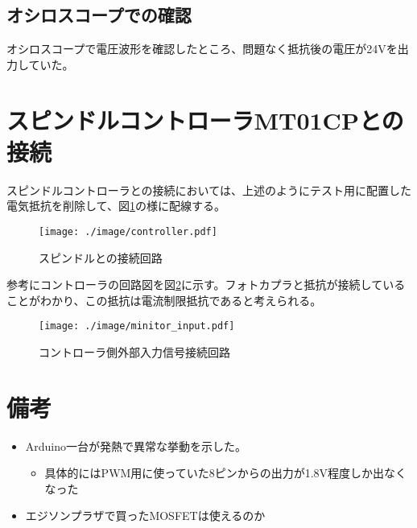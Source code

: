 \documentclass[]{jsarticle}
\begin{document}
\subsection{オシロスコープでの確認}
オシロスコープで電圧波形を確認したところ、問題なく抵抗後の電圧が24Vを出力していた。

\section{スピンドルコントローラMT01CPとの接続}
スピンドルコントローラとの接続においては、上述のようにテスト用に配置した電気抵抗を削除して、図\ref{controller}の様に配線する。
\begin{figure}[htbp]
\centering
\texttt{[image: ./image/controller.pdf]}
\caption{スピンドルとの接続回路}
\label{controller}
\end{figure}

参考にコントローラの回路図を図\ref{input}に示す。フォトカプラと抵抗が接続していることがわかり、この抵抗は電流制限抵抗であると考えられる。
\begin{figure}[htbp]
\centering
\texttt{[image: ./image/minitor\_input.pdf]}
\caption{コントローラ側外部入力信号接続回路}
\label{input}
\end{figure}



%
%




\section{備考}
\begin{itemize}
\item Arduino一台が発熱で異常な挙動を示した。
 \begin{itemize}
   \item 具体的にはPWM用に使っていた8ピンからの出力が1.8V程度しか出なくなった
 \end{itemize}
\item エジソンプラザで買ったMOSFETは使えるのか
\end{itemize}
\end{document}
